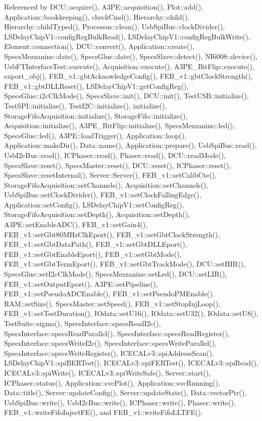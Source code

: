 Referenced by DCU::acquire(), A3PE::acquisition(), Plot::add(), Application::bookkeeping(), checkCmd(), Hierarchy::child(), Hierarchy::childTyped(), Processus::clean(), UsbSpiBus::clockDivider(), LSDelayChipV1::configRegBulkRead(), LSDelayChipV1::configRegBulkWrite(), Element::connection(), DCU::convert(), Application::create(), SpecsMezzanine::date(), SpecsGlue::date(), SpecsSlave::detect(), NI6008::device(), UsbFTInterfaceTest::execute(), Acquisition::execute(), A3PE\_\-BitFlip::execute(), export\_\-obj(), FEB\_\-v1::gbtAcknowledgeConfig(), FEB\_\-v1::gbtClockStrength(), FEB\_\-v1::gbtDLLReset(), LSDelayChipV1::getConfigReg(), SpecsGlue::i2cClkMode(), SpecsSlave::init(), DCU::init(), TestUSB::initialize(), TestSPI::initialize(), TestI2C::initialize(), initialize(), StorageFifoAcquisition::initialize(), StorageFifo::initialize(), Acquisition::initialize(), A3PE\_\-BitFlip::initialize(), SpecsMezzanine::led(), SpecsGlue::led(), A3PE::loadTrigger(), Application::loop(), Application::makeDir(), Data::name(), Application::prepare(), UsbSpiBus::read(), UsbI2cBus::read(), ICPhaser::read(), Phaser::read(), DCU::readMode(), SpecsSlave::reset(), SpecsMaster::reset(), DCU::reset(), ICPhaser::reset(), SpecsSlave::resetInternal(), Server::Server(), FEB\_\-v1::setCalibCte(), StorageFifoAcquisition::setChannels(), Acquisition::setChannels(), UsbSpiBus::setClockDivider(), FEB\_\-v1::setClockFallingEdge(), Application::setConfig(), LSDelayChipV1::setConfigReg(), StorageFifoAcquisition::setDepth(), Acquisition::setDepth(), A3PE::setEnableADC(), FEB\_\-v1::setGain4(), FEB\_\-v1::setGbt80MHzClkEport(), FEB\_\-v1::setGbtClockStrength(), FEB\_\-v1::setGbtDataPath(), FEB\_\-v1::setGbtDLLEport(), FEB\_\-v1::setGbtEnableEport(), FEB\_\-v1::setGbtMode(), FEB\_\-v1::setGbtTermEport(), FEB\_\-v1::setGbtTrackMode(), DCU::setHIR(), SpecsGlue::setI2cClkMode(), SpecsMezzanine::setLed(), DCU::setLIR(), FEB\_\-v1::setOutputEport(), A3PE::setPipeline(), FEB\_\-v1::setPseudoADCEnable(), FEB\_\-v1::setPseudoPMEnable(), RAM::setSize(), SpecsMaster::setSpeed(), FEB\_\-v1::setStopInjLoop(), FEB\_\-v1::setTestDuration(), IOdata::setU16(), IOdata::setU32(), IOdata::setU8(), TestSuite::sigma(), SpecsInterface::specsReadI2c(), SpecsInterface::specsReadParallel(), SpecsInterface::specsReadRegister(), SpecsInterface::specsWriteI2c(), SpecsInterface::specsWriteParallel(), SpecsInterface::specsWriteRegister(), ICECALv3::spiAddressScan(), LSDelayChipV1::spiBERTest(), ICECALv3::spiFERTest(), ICECALv3::spiRead(), ICECALv3::spiWrite(), ICECALv3::spiWriteSafe(), Server::start(), ICPhaser::status(), Application::svcPlot(), Application::svcRunning(), Data::title(), Server::updateConfig(), Server::updateState(), Data::vectorPtr(), UsbSpiBus::write(), UsbI2cBus::write(), ICPhaser::write(), Phaser::write(), FEB\_\-v1::writeFifoInjectFE(), and FEB\_\-v1::writeFifoLLTFE().


